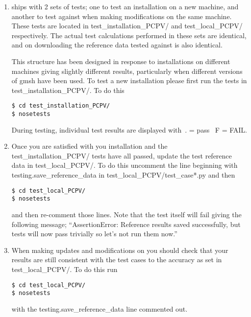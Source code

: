 \documentclass[11pt,a4paper,twoside]{report}
\begin{document}
\begin{enumerate}
\item \CodeName ships with 2 sets of tests; one to test an installation on a new machine, and another to test against when making modifications on the same machine. These tests are located in test\_installation\_PCPV/ and test\_local\_PCPV/ respectively. The actual test calculations performed in these sets are identical, and on downloading the reference data tested against is also identical.

This structure has been designed in response to installations on different machines giving slightly different results, particularly when different versions of gmsh have been used. To test a new installation please first run the tests in test\_installation\_PCPV/. To do this

\begin{lstlisting}
$ cd test_installation_PCPV/
$ nosetests
\end{lstlisting}

During testing, individual test results are displayed with\
. = pass \
F = FAIL.

\item Once you are satisfied with you installation and the test\_installation\_PCPV/ tests have all passed, update the test reference data in test\_local\_PCPV/. To do this uncomment the line beginning with testing.save\_reference\_data in test\_local\_PCPV/test\_case*.py and then

\begin{lstlisting}
$ cd test_local_PCPV/
$ nosetests
\end{lstlisting}

and then re-comment those lines. Note that the test itself will fail giving the following message;
``AssertionError: Reference results saved successfully, but tests will now pass trivially so let's not run them now.''

\item When making updates and modifications on \CodeName you should check that your results are still consistent with the test cases to the accuracy as set in test\_local\_PCPV/. To do this run

\begin{lstlisting}
$ cd test_local_PCPV/
$ nosetests
\end{lstlisting}

with the testing.save\_reference\_data line commented out.
\end{enumerate}
\end{document}
